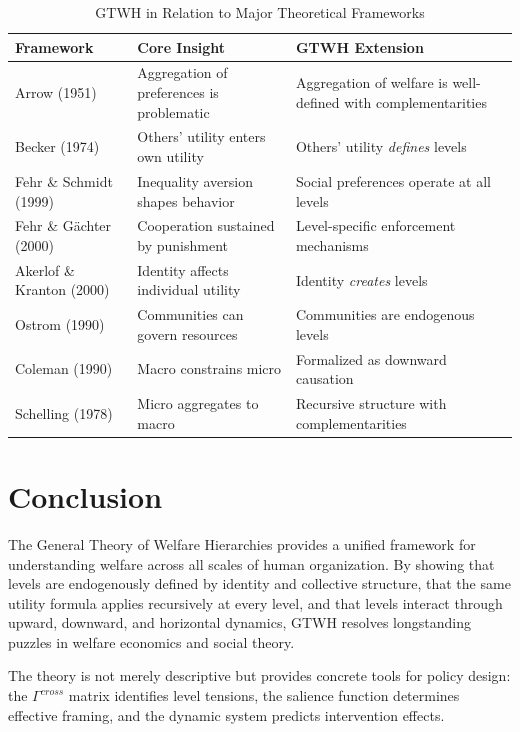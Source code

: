 \documentclass[12pt,a4paper]{article}
\begin{document}
\begin{table}[htbp]
\centering
\caption{GTWH in Relation to Major Theoretical Frameworks}
\label{tab:literature}
\renewcommand{\arraystretch}{1.3}
\small
\begin{tabular}{@{}p{3cm}p{3.5cm}p{5.5cm}@{}}
\toprule
\textbf{Framework} & \textbf{Core Insight} & \textbf{GTWH Extension} \\
\midrule
Arrow (1951) & Aggregation of preferences is problematic & Aggregation of welfare is well-defined with complementarities \\
Becker (1974) & Others' utility enters own utility & Others' utility \textit{defines} levels \\
Fehr \& Schmidt (1999) & Inequality aversion shapes behavior & Social preferences operate at all levels \\
Fehr \& Gächter (2000) & Cooperation sustained by punishment & Level-specific enforcement mechanisms \\
Akerlof \& Kranton (2000) & Identity affects individual utility & Identity \textit{creates} levels \\
Ostrom (1990) & Communities can govern resources & Communities are endogenous levels \\
Coleman (1990) & Macro constrains micro & Formalized as downward causation \\
Schelling (1978) & Micro aggregates to macro & Recursive structure with complementarities \\
\bottomrule
\end{tabular}
\end{table}

\section{Conclusion}
\label{sec:conclusion}

The General Theory of Welfare Hierarchies provides a unified framework for 
understanding welfare across all scales of human organization. By showing 
that levels are endogenously defined by identity and collective structure, 
that the same utility formula applies recursively at every level, and that 
levels interact through upward, downward, and horizontal dynamics, GTWH 
resolves longstanding puzzles in welfare economics and social theory.

The theory is not merely descriptive but provides concrete tools for policy 
design: the $\Gamma^{cross}$ matrix identifies level tensions, the salience 
function determines effective framing, and the dynamic system predicts 
intervention effects.
\end{document}

